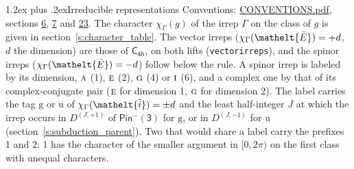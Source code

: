 \documentclass[10pt,a4paper]{article}
\makeatletter
\renewcommand\section{\@startsection{section}{1}{\z@}{-3ex plus -1ex minus -.2ex}%
  {1.2ex plus .2ex}{\normalfont\large\sffamily\bfseries\color{parttitle}}}
\numberwithin{equation}{section}
\newcommand{\eltfont}[1]{{\let\sigma\eltsigma\mathelt{#1}}}
\newcommand{\grp}[1]{\mathsf{#1}}
\newcommand{\irr}[1]{\text{\normalfont\scshape #1}}
\newcommand{\elt}[1]{\eltfont{#1}}
\newcommand{\ptag}[1]{\mathrm{#1}}
\newcommand{\irrJp}[2]{D^{(#1,#2)}}
\newcommand{\irchar}[1]{\chi_{#1}}
\newcommand{\barred}[1]{\bar{#1}}
\newcommand{\lift}[1]{\tilde{#1}}
\makeatother
\begin{document}
\section{Irreducible representations}\label{s:irreps}
Conventions: \href{../../CONVENTIONS.pdf}{CONVENTIONS.pdf}, sections \href{../../../rotation/CONVENTIONS.pdf\#conv.6}{6}, \href{../../../rotation/CONVENTIONS.pdf\#conv.7}{7} and \href{../../CONVENTIONS.pdf\#conv.23}{23}.
\leavevmode\label{n:function.character}\label{n:irrep.Gamma}The character $\irchar{\Gamma}(g)$ of the irrep $\Gamma$ on the class of $g$ is given in section~\ref{s:character_table}. \label{n:index.dimension}The vector irreps ($\irchar{\Gamma}(\elt{\barred{E}}) = +d$, $d$ the dimension) are those of \href{../../../rotation/data/pdf/C4h.pdf}{$\grp{C_{4h}}$}, on both lifts (\texttt{vectorirreps}), and the spinor irreps ($\irchar{\Gamma}(\elt{\barred{E}}) = -d$) follow below the rule. A spinor irrep is labeled by its dimension, $\irr{a}$ (1), $\irr{e}$ (2), $\irr{g}$ (4) or $\irr{i}$ (6), and a complex one by that of its complex-conjugate pair ($\irr{e}$ for dimension 1, $\irr{g}$ for dimension 2). The label carries the tag $\ptag{g}$ or $\ptag{u}$ of $\irchar{\Gamma}(\elt{\lift{i}}) = \pm d$ and the least half-integer $J$ at which the irrep occurs in $\irrJp{J}{+1}$ of $\grp{Pin^{-}(3)}$ for $\ptag{g}$, or in $\irrJp{J}{-1}$ for $\ptag{u}$ (section~\ref{s:subduction_parent}). Two that would share a label carry the prefixes 1 and 2: 1 has the character of the smaller argument in $[0, 2\pi)$ on the first class with unequal characters.
\end{document}
